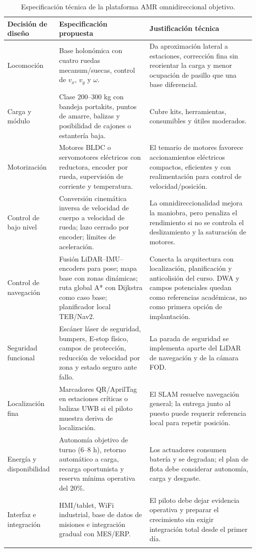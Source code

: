 \begin{longtable}{P{0.22\textwidth}P{0.33\textwidth}P{0.35\textwidth}}
\toprule
Decisión de diseño & Especificación propuesta & Justificación técnica\\
\midrule
\endhead
Locomoción & Base holonómica con cuatro ruedas mecanum/suecas, control de \(v_x\), \(v_y\) y \(\omega\). & Da aproximación lateral a estaciones, corrección fina sin reorientar la carga y menor ocupación de pasillo que una base diferencial.\\
Carga y módulo & Clase 200--300 kg con bandeja portakits, puntos de amarre, balizas y posibilidad de cajones o estantería baja. & Cubre kits, herramientas, consumibles y útiles moderados.\\
Motorización & Motores BLDC o servomotores eléctricos con reductora, encoder por rueda, supervisión de corriente y temperatura. & El temario de motores favorece accionamientos eléctricos compactos, eficientes y con realimentación para control de velocidad/posición.\\
Control de bajo nivel & Conversión cinemática inversa de velocidad de cuerpo a velocidad de rueda; lazo cerrado por encoder; límites de aceleración. & La omnidireccionalidad mejora la maniobra, pero penaliza el rendimiento si no se controla el deslizamiento y la saturación de motores.\\
Control de navegación & Fusión LiDAR--IMU--encoders para pose; mapa base con zonas dinámicas; ruta global A* con Dijkstra como caso base; planificador local TEB/Nav2. & Conecta la arquitectura con localización, planificación y anticolisión del curso. DWA y campos potenciales quedan como referencias académicas, no como primera opción de implantación.\\
Seguridad funcional & Escáner láser de seguridad, bumpers, E-stop físico, campos de protección, reducción de velocidad por zona y estado seguro ante fallo. & La parada de seguridad se implementa aparte del LiDAR de navegación y de la cámara FOD.\\
Localización fina & Marcadores QR/AprilTag en estaciones críticas o balizas UWB si el piloto muestra deriva de localización. & El SLAM resuelve navegación general; la entrega junto al puesto puede requerir referencia local para repetir posición.\\
Energía y disponibilidad & Autonomía objetivo de turno (6--8 h), retorno automático a carga, recarga oportunista y reserva mínima operativa del 20\%. & Los actuadores consumen batería y se degradan; el plan de flota debe considerar autonomía, carga y desgaste.\\
Interfaz e integración & HMI/tablet, WiFi industrial, base de datos de misiones e integración gradual con MES/ERP. & El piloto debe dejar evidencia operativa y preparar el crecimiento sin exigir integración total desde el primer día.\\
\bottomrule
\caption{Especificación técnica de la plataforma AMR omnidireccional objetivo.}
\label{tab:especificacion-amr-objetivo}
\end{longtable}

